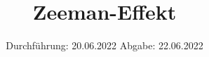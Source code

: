

\subject{V27}
\title{Zeeman-Effekt}
\date{%
  Durchführung: 20.06.2022
  \hspace{3em}
  Abgabe: 22.06.2022
}



\maketitle
\thispagestyle{empty}
\tableofcontents
\newpage






\printbibliography{}


